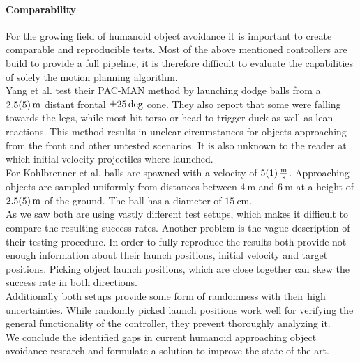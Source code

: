 \paragraph{Comparability} \label{sec:introduction:comparability}
For the growing field of humanoid object avoidance it is important to create comparable and reproducible tests.
Most of the above mentioned controllers are build to provide a full pipeline, it is therefore difficult to evaluate the capabilities of solely the motion planning algorithm.
\\
Yang et al. \cite{yang_2026} test their {PAC-MAN} method by launching dodge balls from a $\SI{2.5 \pm 0.5}{\metre}$ distant frontal $\SI{\pm 25}{\deg}$ cone.
They also report that some were falling towards the legs, while most hit torso or head to trigger duck as well as lean reactions.
This method results in unclear circumstances for objects approaching from the front and other untested scenarios.
It is also unknown to the reader at which initial velocity projectiles where launched.
\\
For Kohlbrenner et al. \cite{kohlbrenner_2026} balls are spawned with a velocity of $\SI{5 \pm 1}{\frac{\metre}{\second}}$.
Approaching objects are sampled uniformly from distances between $\SI{4}{\metre}$ and $\SI{6}{\metre}$ at a height of $\SI{2.5 \pm 0.5}{\metre}$ of the ground.
The ball has a diameter of $\SI{15}{\cm}$.
\\
As we saw both are using vastly different test setups, which makes it difficult to compare the resulting success rates.
Another problem is the vague description of their testing procedure.
In order to fully reproduce the results both provide not enough information about their launch positions, initial velocity and target positions.
Picking object launch positions, which are close together can skew the success rate in both directions.
\\
Additionally both setups provide some form of randomness with their high uncertainties.
While randomly picked launch positions work well for verifying the general functionality of the controller, they prevent thoroughly analyzing it.
\\
We conclude the identified gaps in current humanoid approaching object avoidance research and formulate a solution to improve the state-of-the-art.


